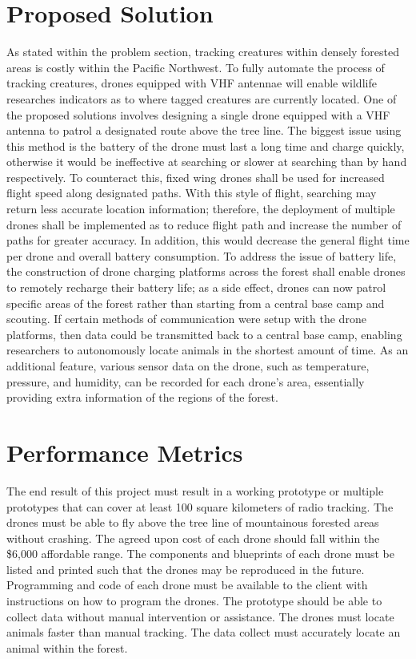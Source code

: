 \documentclass[10pt,journal,draftclsnofoot,onecolumn]{IEEEtran}
\begin{document}
\begin{singlespace}
\section{Proposed Solution}
As stated within the problem section, tracking creatures within densely forested areas is costly within the Pacific Northwest. To fully automate the process of tracking creatures, drones equipped with VHF antennae will enable wildlife researches indicators as to where tagged creatures are currently located. One of the proposed solutions involves designing a single drone equipped with a VHF antenna to patrol a designated route above the tree line. The biggest issue using this method is the battery of the drone must last a long time and charge quickly, otherwise it would be ineffective at searching or slower at searching than by hand respectively. To counteract this, fixed wing drones shall be used for increased flight speed along designated paths. With this style of flight, searching may return less accurate location information; therefore, the deployment of multiple drones shall be implemented as to reduce flight path and increase the number of paths for greater accuracy. In addition, this would decrease the general flight time per drone and overall battery consumption. To address the issue of battery life, the construction of drone charging platforms across the forest shall enable drones to remotely recharge their battery life; as a side effect, drones can now patrol specific areas of the forest rather than starting from a central base camp and scouting. If certain methods of communication were setup with the drone platforms, then data could be transmitted back to a central base camp, enabling researchers to autonomously locate animals in the shortest amount of time. As an additional feature, various sensor data on the drone, such as temperature, pressure, and humidity, can be recorded for each drone's area, essentially providing extra information of the regions of the forest.

\section{Performance Metrics}
The end result of this project must result in a working prototype or multiple prototypes that can cover at least 100 square kilometers of radio tracking. The drones must be able to fly above the tree line of mountainous forested areas without crashing. The agreed upon cost of each drone should fall within the \$6,000 affordable range. The components and blueprints of each drone must be listed and printed such that the drones may be reproduced in the future. Programming and code of each drone must be available to the client with instructions on how to program the drones. The prototype should be able to collect data without manual intervention or assistance. The drones must locate animals faster than manual tracking. The data collect must accurately locate an animal within the forest. 
\end{singlespace}
\end{document}
